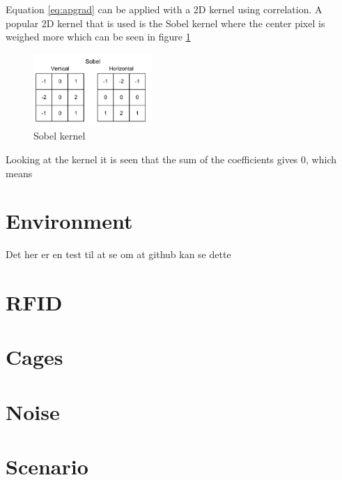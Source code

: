 Equation \ref{eq:apgrad} can be applied with a 2D kernel using correlation. A popular 2D kernel that is used is the Sobel kernel where the center pixel is weighed more which can be seen in figure \ref{fig: sobel}

\begin{figure}[H]  %
	\centering
	\includegraphics[width=0.4\textwidth]{8Misc/Pictures/Introduction/Sobel.png}
	\caption{Sobel kernel \citep[ Chapter~5.2.2]{book:Moeslund}}
	\label{fig: sobel}
\end{figure}

Looking at the kernel it is seen that the sum of the coefficients gives 0, which means 







\section{Environment}
Det her er en test til at se om at github kan se dette

\section{RFID}

\section{Cages}

\section{Noise}

\section{Scenario}




